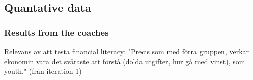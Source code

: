 \subsection{Quantative data}


    \subsubsection{Results from the coaches}



    Relevans av att testa financial literacy: "Precis som med förra gruppen, verkar ekonomin vara det svåraste att förstå (dolda utgifter, hur gå med vinst), som youth." (från iteration 1)

    
